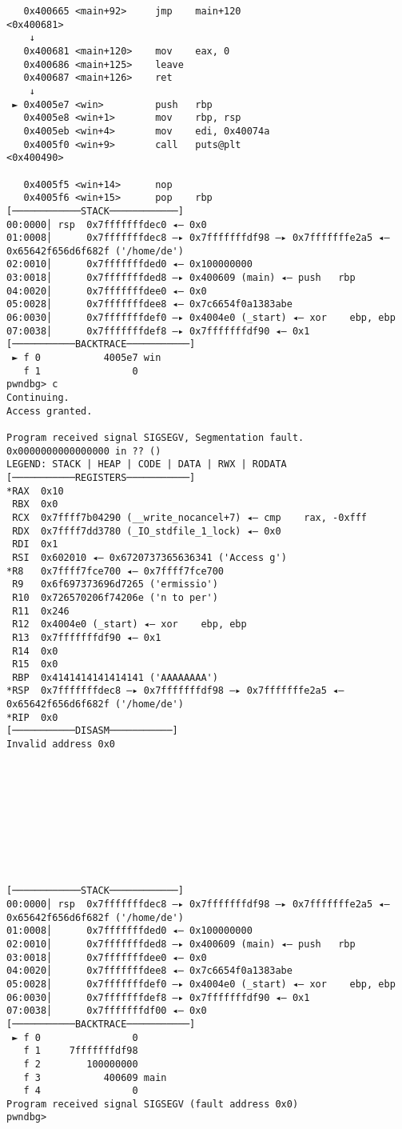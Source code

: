 \begin{lstlisting}
   0x400665 <main+92>     jmp    main+120                      <0x400681>
    ↓
   0x400681 <main+120>    mov    eax, 0
   0x400686 <main+125>    leave  
   0x400687 <main+126>    ret    
    ↓
 ► 0x4005e7 <win>         push   rbp
   0x4005e8 <win+1>       mov    rbp, rsp
   0x4005eb <win+4>       mov    edi, 0x40074a
   0x4005f0 <win+9>       call   puts@plt                      <0x400490>
 
   0x4005f5 <win+14>      nop    
   0x4005f6 <win+15>      pop    rbp
[────────────STACK────────────]
00:0000│ rsp  0x7fffffffdec0 ◂— 0x0
01:0008│      0x7fffffffdec8 —▸ 0x7fffffffdf98 —▸ 0x7fffffffe2a5 ◂— 0x65642f656d6f682f ('/home/de')
02:0010│      0x7fffffffded0 ◂— 0x100000000
03:0018│      0x7fffffffded8 —▸ 0x400609 (main) ◂— push   rbp
04:0020│      0x7fffffffdee0 ◂— 0x0
05:0028│      0x7fffffffdee8 ◂— 0x7c6654f0a1383abe
06:0030│      0x7fffffffdef0 —▸ 0x4004e0 (_start) ◂— xor    ebp, ebp
07:0038│      0x7fffffffdef8 —▸ 0x7fffffffdf90 ◂— 0x1
[───────────BACKTRACE───────────]
 ► f 0           4005e7 win
   f 1                0
pwndbg> c
Continuing.
Access granted.

Program received signal SIGSEGV, Segmentation fault.
0x0000000000000000 in ?? ()
LEGEND: STACK | HEAP | CODE | DATA | RWX | RODATA
[───────────REGISTERS───────────]
*RAX  0x10
 RBX  0x0
 RCX  0x7ffff7b04290 (__write_nocancel+7) ◂— cmp    rax, -0xfff
 RDX  0x7ffff7dd3780 (_IO_stdfile_1_lock) ◂— 0x0
 RDI  0x1
 RSI  0x602010 ◂— 0x6720737365636341 ('Access g')
*R8   0x7ffff7fce700 ◂— 0x7ffff7fce700
 R9   0x6f697373696d7265 ('ermissio')
 R10  0x726570206f74206e ('n to per')
 R11  0x246
 R12  0x4004e0 (_start) ◂— xor    ebp, ebp
 R13  0x7fffffffdf90 ◂— 0x1
 R14  0x0
 R15  0x0
 RBP  0x4141414141414141 ('AAAAAAAA')
*RSP  0x7fffffffdec8 —▸ 0x7fffffffdf98 —▸ 0x7fffffffe2a5 ◂— 0x65642f656d6f682f ('/home/de')
*RIP  0x0
[───────────DISASM───────────]
Invalid address 0x0










[────────────STACK────────────]
00:0000│ rsp  0x7fffffffdec8 —▸ 0x7fffffffdf98 —▸ 0x7fffffffe2a5 ◂— 0x65642f656d6f682f ('/home/de')
01:0008│      0x7fffffffded0 ◂— 0x100000000
02:0010│      0x7fffffffded8 —▸ 0x400609 (main) ◂— push   rbp
03:0018│      0x7fffffffdee0 ◂— 0x0
04:0020│      0x7fffffffdee8 ◂— 0x7c6654f0a1383abe
05:0028│      0x7fffffffdef0 —▸ 0x4004e0 (_start) ◂— xor    ebp, ebp
06:0030│      0x7fffffffdef8 —▸ 0x7fffffffdf90 ◂— 0x1
07:0038│      0x7fffffffdf00 ◂— 0x0
[───────────BACKTRACE───────────]
 ► f 0                0
   f 1     7fffffffdf98
   f 2        100000000
   f 3           400609 main
   f 4                0
Program received signal SIGSEGV (fault address 0x0)
pwndbg> 
\end{lstlisting}

